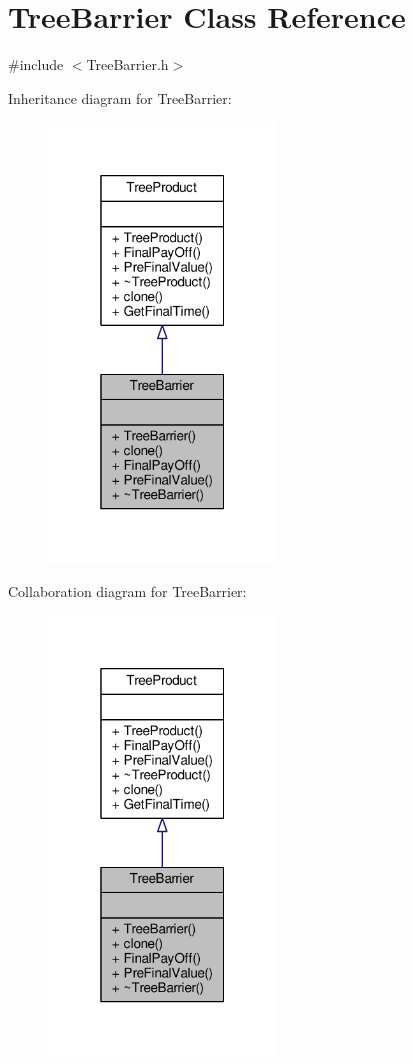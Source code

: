 \hypertarget{classTreeBarrier}{}\section{Tree\+Barrier Class Reference}
\label{classTreeBarrier}


{\ttfamily \#include $<$Tree\+Barrier.\+h$>$}



Inheritance diagram for Tree\+Barrier\+:
\nopagebreak
\begin{figure}[H]
\begin{center}
\leavevmode
\includegraphics[width=172pt]{classTreeBarrier__inherit__graph}
\end{center}
\end{figure}


Collaboration diagram for Tree\+Barrier\+:
\nopagebreak
\begin{figure}[H]
\begin{center}
\leavevmode
\includegraphics[width=172pt]{classTreeBarrier__coll__graph}
\end{center}
\end{figure}
